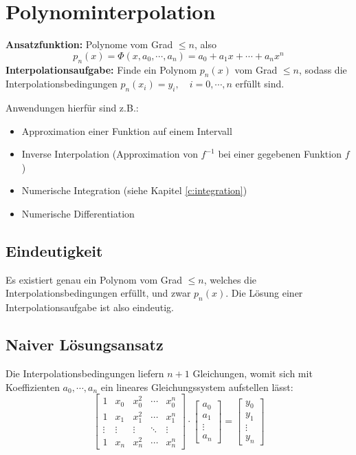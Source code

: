 	\section{Polynominterpolation}
		\textbf{Ansatzfunktion:} Polynome vom Grad \( \leq n \), also
		\begin{equation*}
			p_n(x) = \Phi(x, a_0, \cdots, a_n) = a_0 + a_1 x + \cdots + a_n x^n
		\end{equation*}
		\textbf{Interpolationsaufgabe:} Finde ein Polynom \( p_n(x) \) vom Grad \( \leq n \), sodass die Interpolationsbedingungen \( p_n(x_i) = y_i, \quad i = 0, \cdots, n \) erfüllt sind.

		Anwendungen hierfür sind z.B.:
		\begin{itemize}
			\item Approximation einer Funktion auf einem Intervall
			\item Inverse Interpolation (Approximation von \(f^{-1}\) bei einer gegebenen Funktion \(f\))
			\item Numerische Integration (siehe Kapitel \ref{c:integration})
			\item Numerische Differentiation
		\end{itemize}

		\subsection{Eindeutigkeit}
			Es existiert genau ein Polynom vom Grad \( \leq n \), welches die Interpolationsbedingungen erfüllt, und zwar \(p_n(x)\). Die Lösung einer Interpolationsaufgabe ist also eindeutig.

		\subsection{Naiver Lösungsansatz}
			Die Interpolationsbedingungen liefern \( n + 1 \) Gleichungen, womit sich mit Koeffizienten \( a_0, \cdots, a_n \) ein lineares Gleichungssystem aufstellen lässt:
			\begin{equation*}
				\begin{bmatrix}
					1      & x_0    & x_0^2  & \cdots & x_0^n  \\
					1      & x_1    & x_1^2  & \cdots & x_1^n  \\
					\vdots & \vdots & \vdots & \ddots & \vdots \\
					1      & x_n    & x_n^2  & \cdots & x_n^n
				\end{bmatrix}
				\cdot
				\begin{bmatrix}
					a_0    \\
					a_1    \\
					\vdots \\
					a_n
				\end{bmatrix}
				=
				\begin{bmatrix}
					y_0    \\
					y_1    \\
					\vdots \\
					y_n
				\end{bmatrix}
			\end{equation*}

